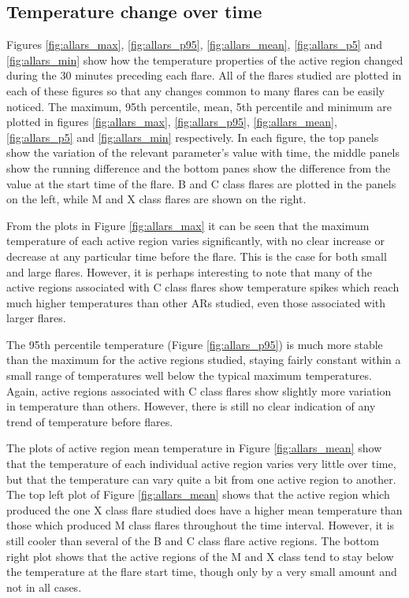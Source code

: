 \documentclass[referee,a4paper,12pt]{swsc}
\begin{document}
\begin{linenumbers}
\subsection{Temperature change over time}
Figures \ref{fig:allars_max}, \ref{fig:allars_p95}, \ref{fig:allars_mean}, \ref{fig:allars_p5} and \ref{fig:allars_min} show how the temperature properties of the active region changed during the 30 minutes preceding each flare.
All of the flares studied are plotted in each of these figures so that any changes common to many flares can be easily noticed.
The maximum, 95th percentile, mean, 5th percentile and minimum are plotted in figures \ref{fig:allars_max}, \ref{fig:allars_p95}, \ref{fig:allars_mean}, \ref{fig:allars_p5} and \ref{fig:allars_min} respectively.
In each figure, the top panels show the variation of the relevant parameter's value with time, the middle panels show the running difference and the bottom panes show the difference from the value at the start time of the flare.
B and C class flares are plotted in the panels on the left, while M and X class flares are shown on the right.

From the plots in Figure \ref{fig:allars_max} it can be seen that the maximum temperature of each active region varies significantly, with no clear increase or decrease at any particular time before the flare.
This is the case for both small and large flares.
However, it is perhaps interesting to note that many of the active regions associated with C class flares show temperature spikes which reach much higher temperatures than other ARs studied, even those associated with larger flares.

The 95th percentile temperature (Figure \ref{fig:allars_p95}) is much more stable than the maximum for the active regions studied, staying fairly constant within a small range of temperatures well below the typical maximum temperatures.
Again, active regions associated with C class flares show slightly more variation in temperature than others.
However, there is still no clear indication of any trend of temperature before flares.

The plots of active region mean temperature in Figure \ref{fig:allars_mean} show that the temperature of each individual active region varies very little over time, but that the temperature can vary quite a bit from one active region to another.
The top left plot of Figure \ref{fig:allars_mean} shows that the active region which produced the one X class flare studied does have a higher mean temperature than those which produced M class flares throughout the time interval.
However, it is still cooler than several of the B and C class flare active regions.
The bottom right plot shows that the active regions of the M and X class tend to stay below the temperature at the flare start time, though only by a very small amount and not in all cases.


\end{linenumbers}
\end{document}
